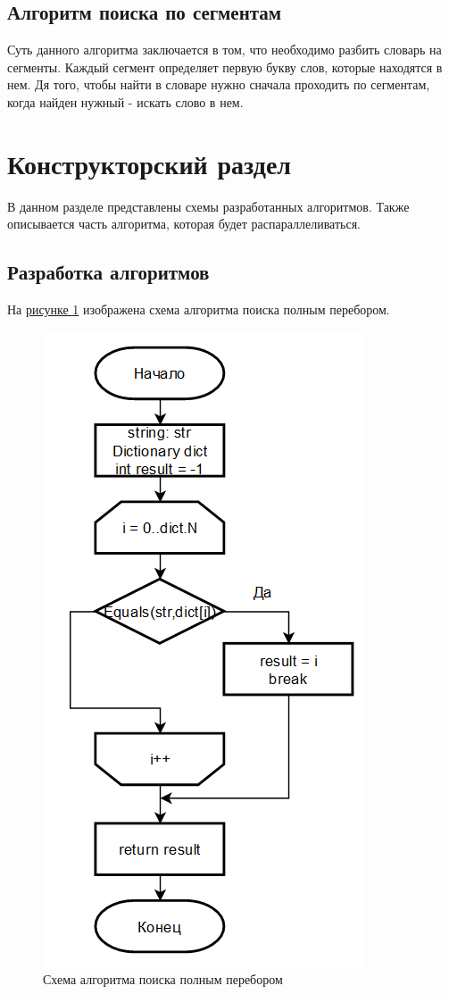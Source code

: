 \documentclass[14pt, a4paper]{extarticle}
\begin{document}
\subsection{Алгоритм поиска по сегментам}
Суть данного алгоритма заключается в том, что необходимо разбить словарь на сегменты. Каждый сегмент определяет первую букву слов, которые находятся в нем. Дя того, чтобы найти в словаре нужно сначала проходить по сегментам, когда найден нужный - искать слово в нем.

\clearpage
\section{Конструкторский раздел}
В данном разделе представлены схемы разработанных алгоритмов. Также описывается часть алгоритма, которая будет распараллеливаться.
\subsection{Разработка алгоритмов}
На \hyperref[Schema1]{рисунке 1} изображена схема алгоритма поиска полным перебором.
\begin{figure}[h!]
	\centering
	\includegraphics[scale=0.9]{source/alg1.png}
	\caption{Схема алгоритма поиска полным перебором}
	\label{Schema1}
\end{figure}
\end{document}
